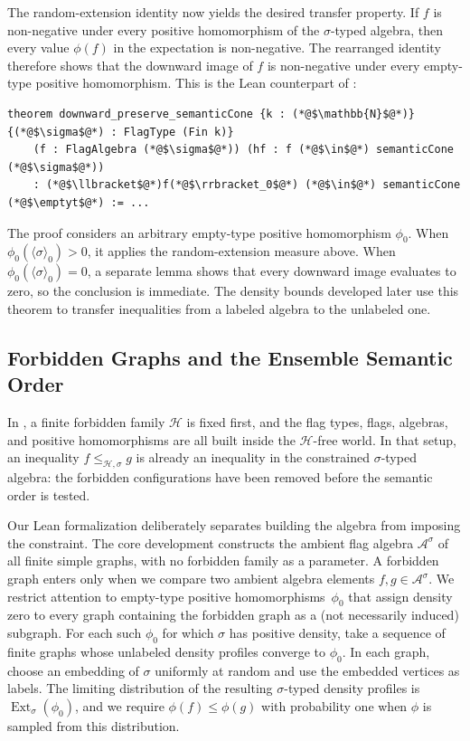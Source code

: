 \documentclass{article}
\newcommand{\emptyt}{\emptyset_{\mathrm{t}}}
\newcommand{\Ext}{\operatorname{Ext}}
\begin{document}
The random-extension identity now yields the desired transfer property.  If
$f$ is non-negative under every positive homomorphism of the $\sigma$-typed
algebra, then every value $\phi(f)$ in the expectation is non-negative.  The
rearranged identity therefore shows that the downward image of $f$ is
non-negative under every empty-type positive homomorphism.  This is the Lean
counterpart of :
\begin{lstlisting}
theorem downward_preserve_semanticCone {k : (*@$\mathbb{N}$@*)} {(*@$\sigma$@*) : FlagType (Fin k)}
    (f : FlagAlgebra (*@$\sigma$@*)) (hf : f (*@$\in$@*) semanticCone (*@$\sigma$@*))
    : (*@$\llbracket$@*)f(*@$\rrbracket_0$@*) (*@$\in$@*) semanticCone (*@$\emptyt$@*) := ...
\end{lstlisting}
The proof considers an arbitrary empty-type positive homomorphism $\phi_0$.
When $\phi_0(\langle\sigma\rangle_0)>0$, it applies the random-extension
measure above.  When $\phi_0(\langle\sigma\rangle_0)=0$, a separate lemma shows
that every downward image evaluates to zero, so the conclusion is immediate.
The density bounds developed later use this theorem to transfer inequalities
from a labeled algebra to the unlabeled one.

\subsection{Forbidden Graphs and the Ensemble Semantic Order}
\label{sec:forbidden}

In , a finite forbidden family \(\mathcal{H}\) is fixed
first, and the flag types, flags, algebras, and positive homomorphisms are all
built inside the \(\mathcal{H}\)-free world.  In that setup, an inequality
\(f\leq_{\mathcal{H},\sigma} g\) is already an inequality in the constrained
\(\sigma\)-typed algebra: the forbidden configurations have been removed
before the semantic order is tested.

Our Lean formalization deliberately separates building the algebra from
imposing the constraint.  The core development constructs the ambient flag
algebra \(\mathcal{A}^\sigma\) of all finite simple graphs, with no forbidden
family as a parameter.  A forbidden graph enters only when we compare two
ambient algebra elements \(f,g\in\mathcal{A}^\sigma\).  We restrict attention to
empty-type positive homomorphisms~\(\phi_0\) that assign density zero to every
graph containing the forbidden graph as a (not necessarily induced) subgraph.
For each such \(\phi_0\) for which \(\sigma\) has positive density, take a
sequence of finite graphs whose unlabeled density profiles converge to
\(\phi_0\).  In each graph, choose an embedding of \(\sigma\) uniformly at random
and use the embedded vertices as labels.  The limiting distribution of the
resulting \(\sigma\)-typed density profiles is \(\Ext_\sigma(\phi_0)\), and we
require \(\phi(f)\leq\phi(g)\) with probability one when \(\phi\) is sampled from
this distribution.
\end{document}
